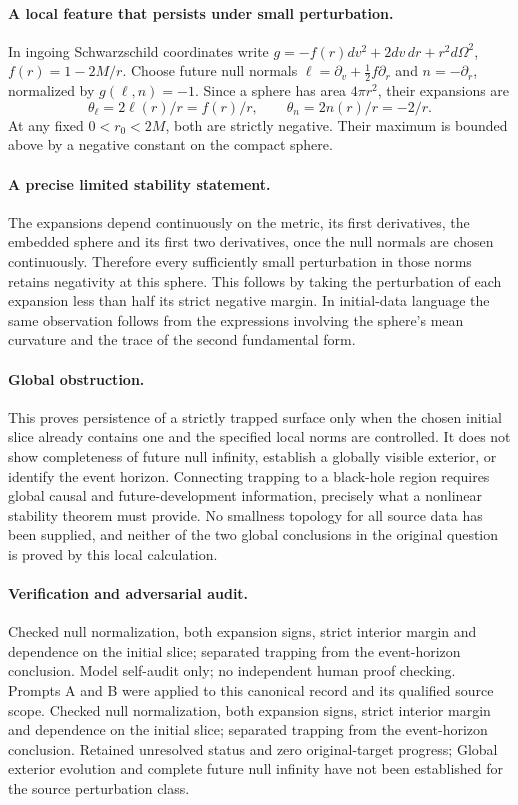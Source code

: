 \documentclass[11pt]{article}
\begin{document}
\paragraph{A local feature that persists under small perturbation.} In ingoing Schwarzschild coordinates write $g=-f(r)dv^2+2dv\,dr+r^2d\Omega^2$, $f(r)=1-2M/r$. Choose future null normals $\ell=\partial_v+\tfrac12f\partial_r$ and $n=-\partial_r$, normalized by $g(\ell,n)=-1$. Since a sphere has area $4\pi r^2$, their expansions are
\[
 \theta_\ell=2\ell(r)/r=f(r)/r,\qquad \theta_n=2n(r)/r=-2/r.
\]
At any fixed $0<r_0<2M$, both are strictly negative. Their maximum is bounded above by a negative constant on the compact sphere.

\paragraph{A precise limited stability statement.} The expansions depend continuously on the metric, its first derivatives, the embedded sphere and its first two derivatives, once the null normals are chosen continuously. Therefore every sufficiently small perturbation in those norms retains negativity at this sphere. This follows by taking the perturbation of each expansion less than half its strict negative margin. In initial-data language the same observation follows from the expressions involving the sphere's mean curvature and the trace of the second fundamental form.

\paragraph{Global obstruction.} This proves persistence of a strictly trapped surface only when the chosen initial slice already contains one and the specified local norms are controlled. It does not show completeness of future null infinity, establish a globally visible exterior, or identify the event horizon. Connecting trapping to a black-hole region requires global causal and future-development information, precisely what a nonlinear stability theorem must provide. No smallness topology for all source data has been supplied, and neither of the two global conclusions in the original question is proved by this local calculation.

\paragraph{Verification and adversarial audit.}
Checked null normalization, both expansion signs, strict interior margin and dependence on the initial slice; separated trapping from the event-horizon conclusion. Model self-audit only; no independent human proof checking. Prompts A and B were applied to this canonical record and its qualified source scope. Checked null normalization, both expansion signs, strict interior margin and dependence on the initial slice; separated trapping from the event-horizon conclusion. Retained unresolved status and zero original-target progress; Global exterior evolution and complete future null infinity have not been established for the source perturbation class.
\end{document}
